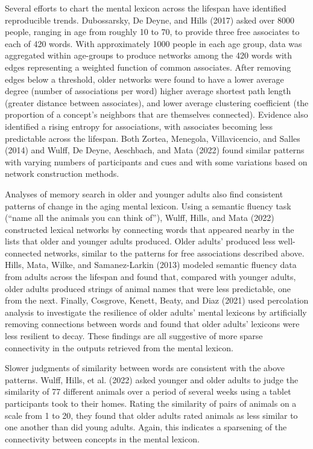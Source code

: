 \documentclass[
  man,floatsintext]{apa6}
\begin{document}
Several efforts to chart the mental lexicon across the lifespan have identified reproducible trends. Dubossarsky, De Deyne, and Hills (2017) asked over 8000 people, ranging in age from roughly 10 to 70, to provide three free associates to each of 420 words. With approximately 1000 people in each age group, data was aggregated within age-groups to produce networks among the 420 words with edges representing a weighted function of common associates. After removing edges below a threshold, older networks were found to have a lower average degree (number of associations per word) higher average shortest path length (greater distance between associates), and lower average clustering coefficient (the proportion of a concept's neighbors that are themselves connected). Evidence also identified a rising entropy for associations, with associates becoming less predictable across the lifespan. Both Zortea, Menegola, Villavicencio, and Salles (2014) and Wulff, De Deyne, Aeschbach, and Mata (2022) found similar patterns with varying numbers of participants and cues and with some variations based on network construction methods.

Analyses of memory search in older and younger adults also find consistent patterns of change in the aging mental lexicon. Using a semantic fluency task (``name all the animals you can think of''), Wulff, Hills, and Mata (2022) constructed lexical networks by connecting words that appeared nearby in the lists that older and younger adults produced. Older adults' produced less well-connected networks, similar to the patterns for free associations described above. Hills, Mata, Wilke, and Samanez-Larkin (2013) modeled semantic fluency data from adults across the lifespan and found that, compared with younger adults, older adults produced strings of animal names that were less predictable, one from the next. Finally, Cosgrove, Kenett, Beaty, and Diaz (2021) used percolation analysis to investigate the resilience of older adults' mental lexicons by artificially removing connections between words and found that older adults' lexicons were less resilient to decay. These findings are all suggestive of more sparse connectivity in the outputs retrieved from the mental lexicon.

Slower judgments of similarity between words are consistent with the above patterns. Wulff, Hills, et al. (2022) asked younger and older adults to judge the similarity of 77 different animals over a period of several weeks using a tablet participants took to their homes. Rating the similarity of pairs of animals on a scale from 1 to 20, they found that older adults rated animals as less similar to one another than did young adults. Again, this indicates a sparsening of the connectivity between concepts in the mental lexicon.
\end{document}
